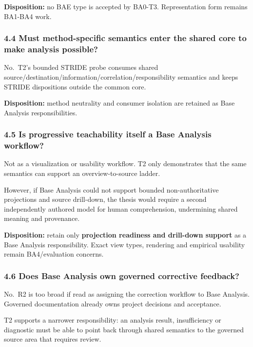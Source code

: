 \documentclass[
  10pt,
]{article}
\begin{document}
\textbf{Disposition:} no BAE type is accepted by BA0-T3. Representation
form remains BA1-BA4 work.

\subsubsection{4.4 Must method-specific semantics enter the shared core
to make analysis
possible?}\label{must-method-specific-semantics-enter-the-shared-core-to-make-analysis-possible}

No.~T2's bounded STRIDE probe consumes shared
source/destination/information/correlation/responsibility semantics and
keeps STRIDE dispositions outside the common core.

\textbf{Disposition:} method neutrality and consumer isolation are
retained as Base Analysis responsibilities.

\subsubsection{4.5 Is progressive teachability itself a Base Analysis
workflow?}\label{is-progressive-teachability-itself-a-base-analysis-workflow}

Not as a visualization or usability workflow. T2 only demonstrates that
the same semantics can support an overview-to-source ladder.

However, if Base Analysis could not support bounded non-authoritative
projections and source drill-down, the thesis would require a second
independently authored model for human comprehension, undermining shared
meaning and provenance.

\textbf{Disposition:} retain only \textbf{projection readiness and
drill-down support} as a Base Analysis responsibility. Exact view types,
rendering and empirical usability remain BA4/evaluation concerns.

\subsubsection{4.6 Does Base Analysis own governed corrective
feedback?}\label{does-base-analysis-own-governed-corrective-feedback}

No.~R2 is too broad if read as assigning the correction workflow to Base
Analysis. Governed documentation already owns project decisions and
acceptance.

T2 supports a narrower responsibility: an analysis result, insufficiency
or diagnostic must be able to point back through shared semantics to the
governed source area that requires review.
\end{document}
